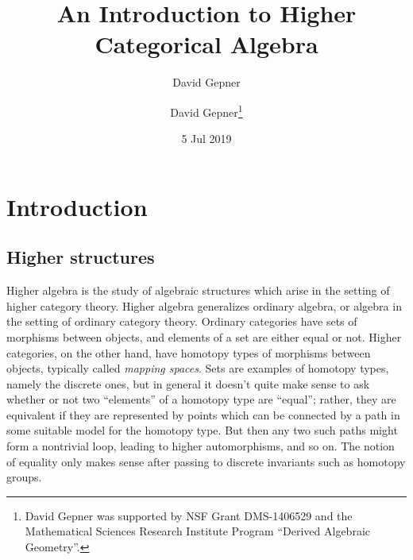 \documentclass[12pt]{article}
\date{5 Jul 2019}
\title{An Introduction to Higher Categorical Algebra}
\author{David Gepner}
\author{David Gepner\thanks{David Gepner was supported by NSF Grant DMS-1406529 and the Mathematical Sciences Research Institute Program ``Derived Algebraic Geometry''.}}
\theoremstyle{definition}
\begin{document}
\maketitle

\tableofcontents


%






\section{Introduction}\label{sec:it}



\subsection{Higher structures}

Higher algebra is the study of algebraic structures which arise in the setting of higher category theory.
Higher algebra generalizes ordinary algebra, or algebra in the setting of ordinary category theory.
Ordinary categories have sets of morphisms between objects, and elements of a set are either equal or not.
Higher categories, on the other hand, have homotopy types of morphisms between objects, typically called {\em mapping spaces}. Sets are examples of homotopy types, namely the discrete ones, but in general it doesn't quite make sense to ask whether or not two ``elements'' of a homotopy type are ``equal''; rather, they are equivalent if they are represented by points which can be connected by a path in some suitable model for the homotopy type. But then any two such paths might form a nontrivial loop, leading to higher automorphisms, and so on.
The notion of equality only makes sense after passing to discrete invariants such as homotopy groups.
\end{document}
